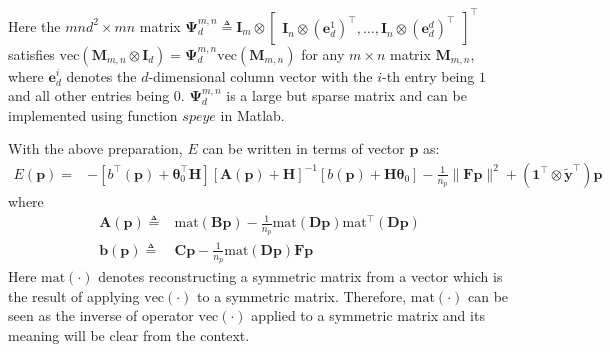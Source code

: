 \documentclass[11pt,bezier,]{article}
\begin{document}
Here  the $mnd^2\times mn$ matrix
$
\boldsymbol\Psi^{m,n}_d\triangleq
   \mathbf I_m \otimes  \begin{bmatrix}
\mathbf I_n \otimes (\mathbf e_d^1)^\top,
\dots,
\mathbf I_n \otimes (\mathbf e_d^d)^\top
\end{bmatrix}^\top
$
satisfies $\text{vec}(\mathbf M_{m,n}\otimes \mathbf I_d)=\boldsymbol\Psi ^{m,n}_d \text{vec}(\mathbf M_{m,n})$
for any $m\times n$ matrix $\mathbf M_{m,n}$,
where  $\mathbf e_d^i$ denotes the  $d$-dimensional column vector 
with  the $i$-th entry being  $1$ and all other entries being   $0$.
$\boldsymbol\Psi^{m,n}_d$ is a large but sparse matrix and can be implemented  using  function $speye$ in Matlab.



With the above preparation, 
$E$  can be written in terms of vector $\mathbf p$ as:
\begin{align}
 E(\mathbf p)
= & -[b^\top(\mathbf p) + \boldsymbol\theta_0^\top\mathbf H][\mathbf A(\mathbf p)+\mathbf H]^{-1} [b(\mathbf p)
+ \mathbf H\boldsymbol\theta_0] %
-\frac{1}{n_p}\| \mathbf F\mathbf p \|^2
 + ({\mathbf 1}^\top \otimes  \mathbf{\widetilde y}^\top) \mathbf p
   \label{eng_reg_vec}
\end{align}
where
\begin{align*}
\mathbf A(\mathbf p)\triangleq &
\text{mat}(\mathbf B\mathbf p)-
\frac{1}{n_p} \text{mat}(\mathbf D\mathbf p) \text{mat}^\top(\mathbf D\mathbf p) \\
\mathbf b(\mathbf p)  \triangleq &
\mathbf C\mathbf p-\frac{1}{n_p} \text{mat}(\mathbf D\mathbf p) \mathbf F\mathbf p
\end{align*}
Here $\text{mat}(\cdot)$ denotes reconstructing a symmetric matrix 
from a vector which is the  result of applying $\text{vec}(\cdot)$ to a symmetric matrix.
Therefore, $\text{mat}(\cdot)$ can be seen as 
the inverse of operator $\text{vec}(\cdot)$ applied to a symmetric matrix
and its meaning will be clear from the context.
\end{document}
